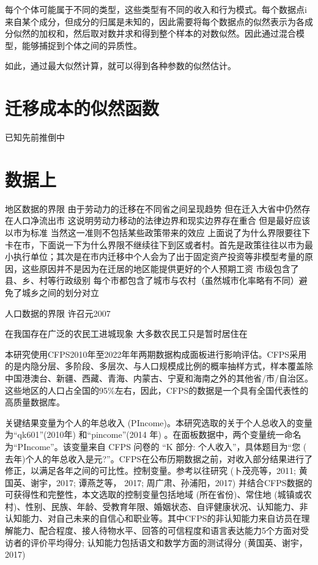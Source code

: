 \documentclass[
  a4paper,
  zihao=-4,
  fontset=mac,
  AutoFakeBold,
  AutoFakeSlant,
  oneside]{ctexbook}
\begin{document}
每个个体可能属于不同的类型，这些类型有不同的收入和行为模式。每个数据点i来自某个成分，但成分的归属是未知的，因此需要将每个数据点的似然表示为各成分似然的加权和，然后取对数并求和得到整个样本的对数似然。因此通过混合模型，能够捕捉到个体之间的异质性。


如此，通过最大似然计算，就可以得到各种参数的似然估计。

\section{迁移成本的似然函数}

已知先前推倒中



\section{数据上}

地区数据的界限
由于劳动力的迁移在不同省之间呈现趋势 但在迁入大省中仍然存在人口净流出市 这说明劳动力移动的法律边界和现实边界存在重合 但是最好应该以市为标准 当然这一准则不包括某些政策带来的效应
上面说了为什么界限要往下卡在市，下面说一下为什么界限不继续往下到区或者村。首先是政策往往以市为最小执行单位；其次是在市内迁移中个人会为了出于固定资产投资等非模型考量的原因，这些原因并不是因为在迁居的地区能提供更好的个人预期工资
市级包含了县、乡、村等行政级别 每个市都包含了城市与农村（虽然城市化率略有不同）避免了城乡之间的划分对立


人口数据的界限
许召元2007

在我国存在广泛的农民工进城现象 大多数农民工只是暂时居住在


本研究使用CFPS2010年至2022年年两期数据构成面板进行影响评估。CFPS采用的是内隐分层、多阶段、多层次、与人口规模成比例的概率抽样方式，样本覆盖除中国港澳台、新疆、西藏、青海、内蒙古、宁夏和海南之外的其他省/市/自治区。这些地区的人口占全国的95\%左右，因此，CFPS的数据是一个具有全国代表性的高质量数据库。

关键结果变量为个人的年总收入 (PIncome)。本研究选取的关于个人总收入的变量为“qk601”(2010年) 和“pincome”(2014 年) 。在面板数据中，两个变量统一命名为“PIncome”。该变量来自 CFPS 问卷的 “K 部分: 个人收入”，具体题目为“您 ( 去年)个人的年总收入是元?”。CFPS在公布历期数据之前，对收入部分结果进行了修正，以满足各年之间的可比性。控制变量。参考以往研究 (卜茂亮等，2011; 黄国英、谢宇，2017; 谭燕芝等， 2017; 周广肃、孙浦阳，2017) 并结合CFPS数据的可获得性和完整性，本文选取的控制变量包括地域 (所在省份)、常住地 (城镇或农村)、性别、民族、年龄、受教育年限、婚姻状态、自评健康状况、认知能力、非认知能力、对自己未来的自信心和职业等。其中CFPS的非认知能力来自访员在理解能力、配合程度、接人待物水平、回答的可信程度和语言表达能力5个方面对受访者的评价平均得分; 认知能力包括语文和数学方面的测试得分 (黄国英、谢宇，2017)
\end{document}
